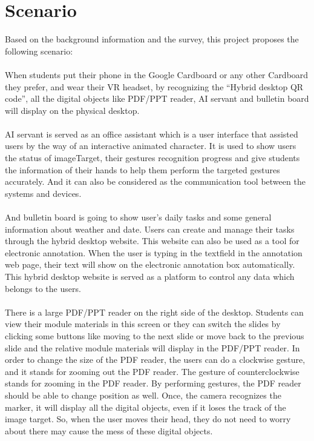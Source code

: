 \section{Scenario}
Based on the background information and the survey, this project proposes the following scenario:
\\
\\
When students put their phone in the Google Cardboard or any other Cardboard they prefer, and wear their VR headset, by recognizing the “Hybrid desktop QR code”, all the digital objects like PDF/PPT reader, AI servant and bulletin board will display on the physical desktop.
\\
\\
AI servant is served as an office assistant which is a user interface that assisted users by the way of an interactive animated character. It is used to show users the status of imageTarget, their gestures recognition progress and give students the information of their hands to help them perform the targeted gestures accurately. And it can also be considered as the communication tool between the systems and devices. 
\\
\\
And bulletin board is going to show user’s daily tasks and some general information about weather and date. Users can create and manage their tasks through the hybrid desktop website. This website can also be used as a tool for electronic annotation. When the user is typing in the textfield in the annotation web page, their text will show on the electronic annotation box automatically. This hybrid desktop website is served as a platform to control any data which belongs to the users. 
\\
\\
There is a large PDF/PPT reader on the right side of the desktop. Students can view their module materials in this screen or they can switch the slides by clicking some buttons like moving to the next slide or move back to the previous slide and the relative module materials will display in the PDF/PPT reader. In order to change the size of the PDF reader, the users can do a clockwise gesture, and it stands for zooming out the PDF reader. The gesture of counterclockwise stands for zooming in the PDF reader. By performing gestures, the PDF reader should be able to change position as well. Once, the camera recognizes the marker, it will display all the digital objects, even if it loses the track of the image target. So, when the user moves their head, they do not need to worry about there may cause the mess of these digital objects.


